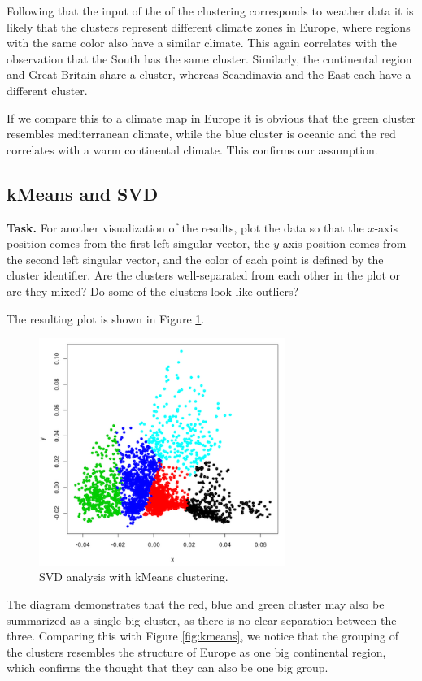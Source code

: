 \documentclass{support/acm_proc_article-sp}
\begin{document}
    Following that the input of the of the clustering corresponds to weather data it is likely that the clusters represent
    different climate zones in Europe, where regions with the same color also have a similar climate.
    This again correlates with the observation that the South has the same cluster.
    Similarly, the continental region and Great Britain share
    a cluster, whereas Scandinavia and the East each have a different cluster.

    If we compare this to a climate map in Europe it is obvious that the green cluster resembles mediterranean
    climate, while the blue cluster is oceanic and the red correlates with a warm continental climate.
    This confirms our assumption.


    \subsection{kMeans and SVD}
    \label{subsec:kmeans-svd}

    \textbf{Task.} For another visualization of the results, plot the data so that the $x$-axis position comes from the
    first left singular vector, the $y$-axis position comes from the second left singular vector, and the color of each
    point is defined by the cluster identifier.
    Are the clusters well-separated from each other in the plot or are they mixed?
    Do some of the clusters look like outliers?

    The resulting plot is shown in Figure \ref{fig:kmeans-svd}.
    \begin{figure}[!htbp]
        \centering
        \includegraphics[width=8cm]{images/kmeans-svd.png}
        \caption{SVD analysis with kMeans clustering.}
        \label{fig:kmeans-svd}
    \end{figure}
    The diagram demonstrates that the red, blue and green cluster may also be summarized as a single big cluster,
    as there is no clear separation between the three.
    Comparing this with Figure \ref{fig:kmeans}, we notice that the grouping of the clusters resembles the structure
    of Europe as one big continental region, which confirms the thought that they can also be one big group.
\end{document}
